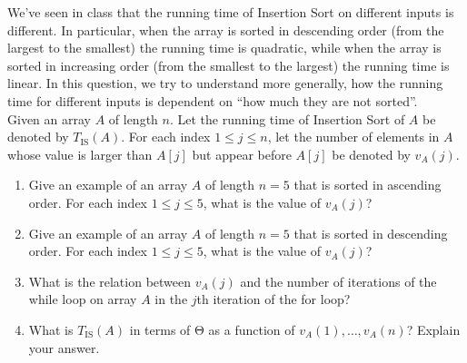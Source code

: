 \documentclass[fleqn, a4paper, 11pt, oneside]{amsart}
\theoremstyle{definition}
\theoremstyle{theorem}
\begin{document}
\begin{question}
	We've seen in class that the running time of Insertion Sort on different inputs is different.
	In particular, when the array is sorted in descending order (from the largest to the smallest) the running time is quadratic, while when the array is sorted in increasing order (from the smallest to the largest) the running time is linear.
	In this question, we try to understand more generally, how the running time for different inputs is dependent on ``how much they are not sorted''.\\
	Given an array $A$ of length $n$.
	Let the running time of Insertion Sort of $A$ be denoted by $T_{\text{IS}}(A)$.
	For each index $1 \le j \le n$, let the number of elements in $A$ whose value is larger than $A[j]$ but appear before $A[j]$ be denoted by $v_A(j)$.
	\begin{enumerate}
		\item
			Give an example of an array $A$ of length $n = 5$ that is sorted in ascending order.
			For each index $1 \le j \le 5$, what is the value of $v_A(j)$?
		\item
			Give an example of an array $A$ of length $n = 5$ that is sorted in descending order.
			For each index $1 \le j \le 5$, what is the value of $v_A(j)$?
		\item
			What is the relation between $v_A(j)$ and the number of iterations of the while loop on array $A$ in the $j$th iteration of the for loop?
		\item
			What is $T_{\text{IS}}(A)$ in terms of $\mathrm{\Theta}$ as a function of $v_A(1),\dots,v_A(n)$?
			Explain your answer.
	\end{enumerate}
\end{question}
\end{document}
